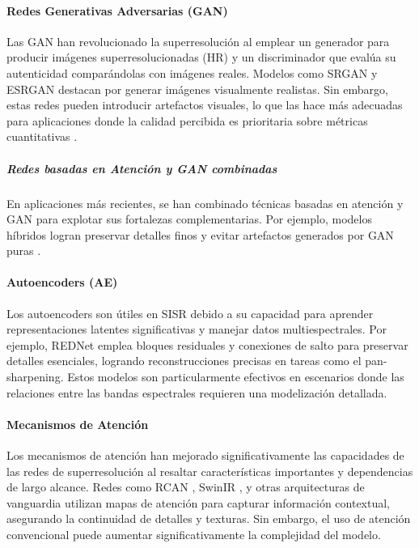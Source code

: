             \paragraph{Redes Generativas Adversarias (GAN)}

                Las GAN han revolucionado la superresolución al emplear un generador para producir imágenes superresolucionadas (HR) y un discriminador que evalúa su autenticidad comparándolas con imágenes reales. Modelos como SRGAN \autocite{ledig2017photo} y ESRGAN \autocite{wang2018esrgan} destacan por generar imágenes visualmente realistas. Sin embargo, estas redes pueden introducir artefactos visuales, lo que las hace más adecuadas para aplicaciones donde la calidad percibida es prioritaria sobre métricas cuantitativas \autocite{creswell2018generative}.

                \subparagraph{Redes basadas en Atención y GAN combinadas}
            
                    En aplicaciones más recientes, se han combinado técnicas basadas en atención y GAN para explotar sus fortalezas complementarias. Por ejemplo, modelos híbridos logran preservar detalles finos y evitar artefactos generados por GAN puras \autocite{wang2021multisensor}.
                    
            
            \paragraph{Autoencoders (AE)}
            
                Los autoencoders son útiles en SISR debido a su capacidad para aprender representaciones latentes significativas y manejar datos multiespectrales. Por ejemplo, REDNet \autocite{mao2016image} emplea bloques residuales y conexiones de salto para preservar detalles esenciales, logrando reconstrucciones precisas en tareas como el pan-sharpening. Estos modelos son particularmente efectivos en escenarios donde las relaciones entre las bandas espectrales requieren una modelización detallada.
            
            \paragraph{Mecanismos de Atención}

                Los mecanismos de atención han mejorado significativamente las capacidades de las redes de superresolución al resaltar características importantes y dependencias de largo alcance. Redes como RCAN \autocite{[60]zhang2018rcan}, SwinIR \autocite{[32]liang2021swinir}, y otras arquitecturas de vanguardia \autocite{[6]cao2023ciaosr, [8]choi2023ngram, [20]hui2019lightweight_acm, [27]kong2022residual, [35]liu2020residual_feature, [42]muqeet2020multi, [53]wang2023omni} utilizan mapas de atención para capturar información contextual, asegurando la continuidad de detalles y texturas. Sin embargo, el uso de atención convencional puede aumentar significativamente la complejidad del modelo.

